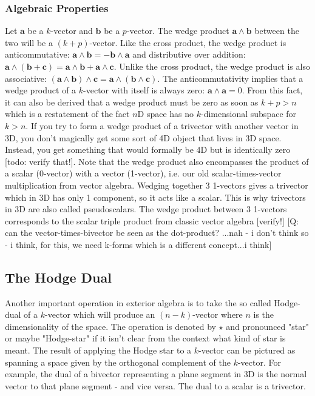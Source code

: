 \subsubsection{Algebraic Properties}
Let $\mathbf{a}$ be a $k$-vector and $\mathbf{b}$ be a $p$-vector. The wedge product $\mathbf{a \wedge b}$ between the two will be a $(k+p)$-vector. Like the cross product, the wedge product is anticommutative: $\mathbf{a \wedge b} = -\mathbf{b \wedge a}$ and distributive over addition: $\mathbf{a \wedge (b + c) = a \wedge b + a \wedge c }$. Unlike the cross product, the wedge product is also associative: $\mathbf{(a \wedge b) \wedge c = a \wedge (b \wedge c)}$. The anticommutativity implies that a wedge product of a $k$-vector with itself is always zero: $\mathbf{a \wedge a} = 0$. From this fact, it can also be derived that a wedge product must be zero as soon as $k+p > n$ which is a restatement of the fact $n$D space has no $k$-dimensional subspace for $k>n$. If you try to form a wedge product of a trivector with another vector in 3D, you don't magically get some sort of 4D object that lives in 3D space. Instead, you get something that would formally be 4D but is identically zero [todo: verify that!]. Note that the wedge product also encompasses the product of a scalar (0-vector) with a vector (1-vector), i.e. our old scalar-times-vector multiplication from vector algebra. Wedging together 3 1-vectors gives a trivector which in 3D has only 1 component, so it acts like a scalar. This is why trivectors in 3D are also called pseudoscalars. The wedge product between 3 1-vectors corresponds to the scalar triple product from classic vector algebra [verify!] [Q: can the vector-times-bivector be seen as the dot-product? ...nah - i don't think so - i think, for this, we need k-forms which is a different concept...i think]


\subsection{The Hodge Dual}
Another important operation in exterior algebra is to take the so called Hodge-dual of a $k$-vector which will produce an $(n-k)$-vector where $n$ is the dimensionality of the space. The operation is denoted by $\star$ and pronounced "star" or maybe "Hodge-star" if it isn't clear from the context what kind of star is meant. The result of applying the Hodge star to a $k$-vector can be pictured as spanning a space given by the orthogonal complement of the $k$-vector. For example, the dual of a bivector representing a plane segment in 3D is the normal vector to that plane segment - and vice versa. The dual to a scalar is a trivector.

